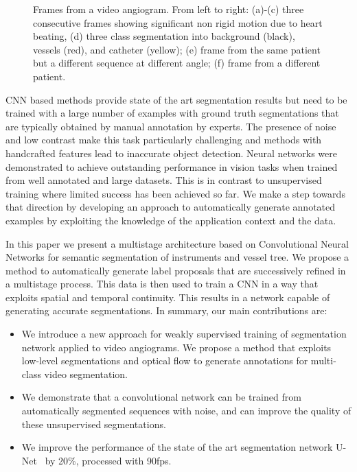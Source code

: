 \documentclass{bmvc2k}
\begin{document}
	\begin{figure}[h]
		\begin{adjustbox}{width=\textwidth}
			
			
			
			
			\caption{Frames from a video angiogram. From left to right: (a)-(c) three consecutive frames showing significant non rigid motion due to heart beating, (d) three class segmentation into background (black), vessels (red), and catheter (yellow);  (e) frame from the same patient but a different sequence at different angle; (f) frame from a different patient.}
			\label{illustration}
		\end{adjustbox}
		
	\end{figure}
	CNN based methods provide state of the art segmentation results but need to be trained with a large number of examples with ground truth segmentations  that are typically obtained by manual annotation by experts. The presence of noise and low contrast make this task particularly challenging and methods with handcrafted features lead to inaccurate object detection. Neural networks were demonstrated to achieve outstanding performance in vision tasks when trained from well annotated and large datasets. This is in contrast to unsupervised training where limited success has been achieved so far. We make a step towards that direction by developing an approach to automatically generate annotated examples by exploiting the knowledge of the application context and the data.
	
	
	In this paper we present a multistage architecture based on Convolutional Neural Networks for semantic segmentation of instruments and vessel tree. 
	We propose a method to automatically generate label proposals that are successively refined in a multistage process. This data is then used to train a CNN in a way that exploits spatial and temporal continuity. This results in a network capable of generating accurate segmentations. 
	In summary, our main contributions are: 
	\begin{itemize}
		\item We introduce a new approach for weakly supervised training of segmentation network applied to video angiograms. We propose a method that exploits low-level segmentations and optical flow to generate annotations for  multi-class video segmentation.
		\item We demonstrate that a convolutional  network can be trained from automatically segmented sequences with noise, and can improve the quality of these unsupervised segmentations. 
		\item We improve the performance of the state of the art segmentation network U-Net~\cite{unet} by 20\%, processed with 90fps.
	\end{itemize}
	
\end{document}
